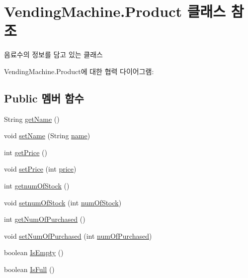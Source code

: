 \hypertarget{class_vending_machine_1_1_product}{}\section{Vending\+Machine.\+Product 클래스 참조}
\label{class_vending_machine_1_1_product}


음료수의 정보를 담고 있는 클래스  




Vending\+Machine.\+Product에 대한 협력 다이어그램\+:
\subsection*{Public 멤버 함수}
\begin{DoxyCompactItemize}
\item 
String \hyperlink{class_vending_machine_1_1_product_a9e33b9ce41e8a1cfcd6d394cbe82889b}{get\+Name} ()
\item 
void \hyperlink{class_vending_machine_1_1_product_aebc054f256e924dcfa3bdb92e3521a70}{set\+Name} (String \hyperlink{class_vending_machine_1_1_product_a6d22fc106e78c69153cbf8d4ca1d53e3}{name})
\item 
int \hyperlink{class_vending_machine_1_1_product_abf388db99a413403b8ebad6abe8bb593}{get\+Price} ()
\item 
void \hyperlink{class_vending_machine_1_1_product_aeeb4f3eab646fc9d1a4bb5271fd9aeb3}{set\+Price} (int \hyperlink{class_vending_machine_1_1_product_a5f80a5a57248015f48edb6354b6d23ed}{price})
\item 
int \hyperlink{class_vending_machine_1_1_product_a199bec8565bf69e9231248a49076a01b}{getnum\+Of\+Stock} ()
\item 
void \hyperlink{class_vending_machine_1_1_product_a09bbd37ae2e203492a3ca553adf3a8fc}{setnum\+Of\+Stock} (int \hyperlink{class_vending_machine_1_1_product_ab5412dead0747c2da7e8e686c2e7bd15}{num\+Of\+Stock})
\item 
int \hyperlink{class_vending_machine_1_1_product_aefa8a5881c5569171a8cf1161b4bd911}{get\+Num\+Of\+Purchased} ()
\item 
void \hyperlink{class_vending_machine_1_1_product_a45ff6ad466f274711d19adf7afbef20b}{set\+Num\+Of\+Purchased} (int \hyperlink{class_vending_machine_1_1_product_a7aed5b6b474729af5d417af9f7d8115e}{num\+Of\+Purchased})
\item 
boolean \hyperlink{class_vending_machine_1_1_product_a30a3d227efda7f0041ee4585d529ec45}{Is\+Empty} ()
\item 
boolean \hyperlink{class_vending_machine_1_1_product_ac21e8cb627fddac1d392a765348c630e}{Is\+Full} ()
\end{DoxyCompactItemize}
